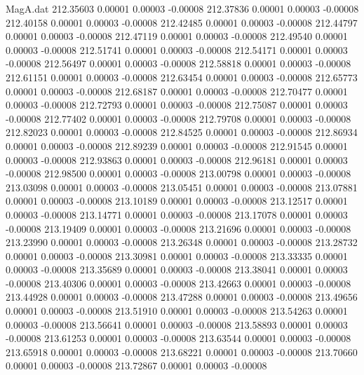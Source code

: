 \begin{filecontents}{MagA.dat}
 212.35603    0.00001    0.00003   -0.00008
 212.37836    0.00001    0.00003   -0.00008
 212.40158    0.00001    0.00003   -0.00008
 212.42485    0.00001    0.00003   -0.00008
 212.44797    0.00001    0.00003   -0.00008
 212.47119    0.00001    0.00003   -0.00008
 212.49540    0.00001    0.00003   -0.00008
 212.51741    0.00001    0.00003   -0.00008
 212.54171    0.00001    0.00003   -0.00008
 212.56497    0.00001    0.00003   -0.00008
 212.58818    0.00001    0.00003   -0.00008
 212.61151    0.00001    0.00003   -0.00008
 212.63454    0.00001    0.00003   -0.00008
 212.65773    0.00001    0.00003   -0.00008
 212.68187    0.00001    0.00003   -0.00008
 212.70477    0.00001    0.00003   -0.00008
 212.72793    0.00001    0.00003   -0.00008
 212.75087    0.00001    0.00003   -0.00008
 212.77402    0.00001    0.00003   -0.00008
 212.79708    0.00001    0.00003   -0.00008
 212.82023    0.00001    0.00003   -0.00008
 212.84525    0.00001    0.00003   -0.00008
 212.86934    0.00001    0.00003   -0.00008
 212.89239    0.00001    0.00003   -0.00008
 212.91545    0.00001    0.00003   -0.00008
 212.93863    0.00001    0.00003   -0.00008
 212.96181    0.00001    0.00003   -0.00008
 212.98500    0.00001    0.00003   -0.00008
 213.00798    0.00001    0.00003   -0.00008
 213.03098    0.00001    0.00003   -0.00008
 213.05451    0.00001    0.00003   -0.00008
 213.07881    0.00001    0.00003   -0.00008
 213.10189    0.00001    0.00003   -0.00008
 213.12517    0.00001    0.00003   -0.00008
 213.14771    0.00001    0.00003   -0.00008
 213.17078    0.00001    0.00003   -0.00008
 213.19409    0.00001    0.00003   -0.00008
 213.21696    0.00001    0.00003   -0.00008
 213.23990    0.00001    0.00003   -0.00008
 213.26348    0.00001    0.00003   -0.00008
 213.28732    0.00001    0.00003   -0.00008
 213.30981    0.00001    0.00003   -0.00008
 213.33335    0.00001    0.00003   -0.00008
 213.35689    0.00001    0.00003   -0.00008
 213.38041    0.00001    0.00003   -0.00008
 213.40306    0.00001    0.00003   -0.00008
 213.42663    0.00001    0.00003   -0.00008
 213.44928    0.00001    0.00003   -0.00008
 213.47288    0.00001    0.00003   -0.00008
 213.49656    0.00001    0.00003   -0.00008
 213.51910    0.00001    0.00003   -0.00008
 213.54263    0.00001    0.00003   -0.00008
 213.56641    0.00001    0.00003   -0.00008
 213.58893    0.00001    0.00003   -0.00008
 213.61253    0.00001    0.00003   -0.00008
 213.63544    0.00001    0.00003   -0.00008
 213.65918    0.00001    0.00003   -0.00008
 213.68221    0.00001    0.00003   -0.00008
 213.70660    0.00001    0.00003   -0.00008
 213.72867    0.00001    0.00003   -0.00008

\end{filecontents}
